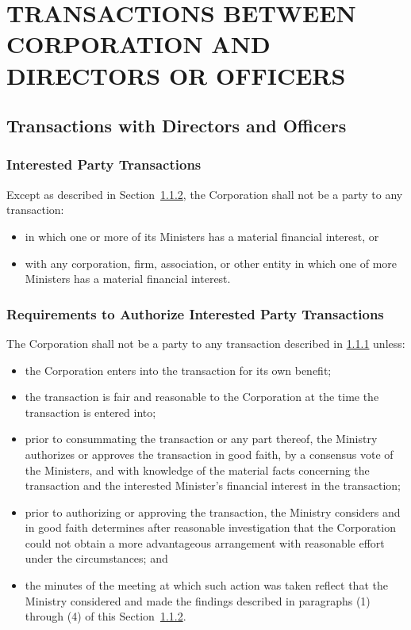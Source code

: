 \documentclass[letterpaper,titlepage]{article}
\begin{document}
\section{TRANSACTIONS BETWEEN CORPORATION AND DIRECTORS OR OFFICERS}
\label{sec:transactionsBetween}
\subsection{Transactions with Directors and Officers}
\label{sec:transactionsWith}
\subsubsection{Interested Party Transactions}
\label{sec:interestedParty}
Except as described in Section~\ref{sec:requirementsAuthorize}, the Corporation shall not be a party to any transaction:
\begin{itemize}
    \item[(1)] in which one or more of its Ministers has a material financial
        interest, or
    \item[(2)] with any corporation, firm, association, or other entity in which one
        of more Ministers has a material financial interest.
\end{itemize}
\subsubsection{Requirements to Authorize Interested Party Transactions}
\label{sec:requirementsAuthorize}
The Corporation shall not be a party to any transaction described in
\ref{sec:interestedParty} unless:
\begin{itemize}
    \item[(1)] the Corporation enters into the transaction for its own benefit;
    \item[(2)] the transaction is fair and reasonable to the Corporation at the time
        the transaction is entered into;
    \item[(3)] prior to consummating the transaction or any part thereof, the
        Ministry authorizes or approves the transaction in good faith, by a
        consensus vote of the Ministers, and with knowledge of the material
        facts concerning the transaction and the interested Minister's
        financial interest in the transaction;
    \item[(4)] prior to authorizing or approving the transaction, the Ministry
        considers and in good faith determines after reasonable investigation
        that the Corporation could not obtain a more advantageous arrangement
        with reasonable effort under the circumstances; and
    \item[(5)] the minutes of the meeting at which such action was taken reflect
        that the Ministry considered and made the findings described in
        paragraphs (1) through (4) of this
        Section~\ref{sec:requirementsAuthorize}.
\end{itemize}
\end{document}
